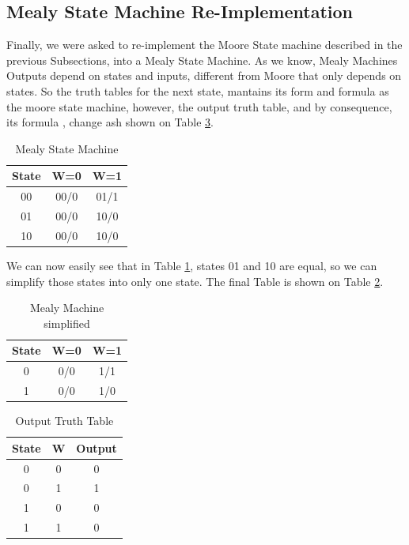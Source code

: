 \subsection{\color{purple}Mealy State Machine Re-Implementation}

Finally, we were asked to re-implement the Moore State machine described
in the previous Subsections, into a Mealy State Machine. As we know,
Mealy Machines Outputs depend on states and inputs, different from
Moore that only depends on states. So the truth tables for the next
state, mantains its form and formula as the moore state machine, however,
the output truth table, and by consequence, its formula , change ash
shown on Table \ref{3_t_3}.

\begin{table}[H]
\begin{centering}
\begin{tabular}{|c|c|c|}
\hline 
State & W=0 & W=1\tabularnewline
\hline 
\hline 
00 & 00/0 & 01/1\tabularnewline
\hline 
01 & 00/0 & 10/0\tabularnewline
\hline 
10 & 00/0 & 10/0\tabularnewline
\hline 
\end{tabular}
\par\end{centering}
\caption{Mealy State Machine}
\label{3_t_4}
\end{table}

We can now easily see that in Table \ref{3_t_4}, states 01 and 10
are equal, so we can simplify those states into only one state. The
final Table is shown on Table \ref{3_t_5}.

\begin{table}[H]
\begin{centering}
\begin{tabular}{|c|c|c|}
\hline 
State & W=0 & W=1\tabularnewline
\hline 
\hline 
0 & 0/0 & 1/1\tabularnewline
\hline 
1 & 0/0 & 1/0\tabularnewline
\hline 
\end{tabular}
\par\end{centering}
\caption{Mealy Machine simplified}

\label{3_t_5}
\end{table}

\begin{table}[H]
\begin{centering}
\begin{tabular}{|c|c|c|}
\hline 
State & W & Output\tabularnewline
\hline 
\hline 
0 & 0 & 0\tabularnewline
\hline 
0 & 1 & 1\tabularnewline
\hline 
1 & 0 & 0\tabularnewline
\hline 
1 & 1 & 0\tabularnewline
\hline 
\end{tabular}
\par\end{centering}
\caption{Output Truth Table}

\label{3_t_3}
\end{table}

